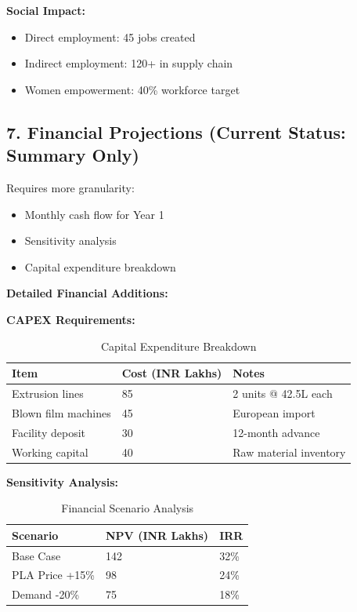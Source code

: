 \textbf{Social Impact:}
\begin{itemize}
\item Direct employment: 45 jobs created
\item Indirect employment: 120+ in supply chain
\item Women empowerment: 40\% workforce target
\end{itemize}

\subsection*{7. Financial Projections (Current Status: Summary Only)}
Requires more granularity:
\begin{itemize}
\item Monthly cash flow for Year 1
\item Sensitivity analysis
\item Capital expenditure breakdown
\end{itemize}

\textbf{Detailed Financial Additions:}

\textbf{CAPEX Requirements:}

\begin{table}[h]
\centering
\caption{Capital Expenditure Breakdown}
\begin{tabular}{|l|l|l|}
\hline
\textbf{Item} & \textbf{Cost (INR Lakhs)} & \textbf{Notes} \\ \hline
Extrusion lines & 85 & 2 units @ 42.5L each \\ \hline
Blown film machines & 45 & European import \\ \hline
Facility deposit & 30 & 12-month advance \\ \hline
Working capital & 40 & Raw material inventory \\ \hline
\end{tabular}
\end{table}

\textbf{Sensitivity Analysis:}

\begin{table}[h]
\centering
\caption{Financial Scenario Analysis}
\begin{tabular}{|l|l|l|}
\hline
\textbf{Scenario} & \textbf{NPV (INR Lakhs)} & \textbf{IRR} \\ \hline
Base Case & 142 & 32\% \\ \hline
PLA Price +15\% & 98 & 24\% \\ \hline
Demand -20\% & 75 & 18\% \\ \hline
\end{tabular}
\end{table}

